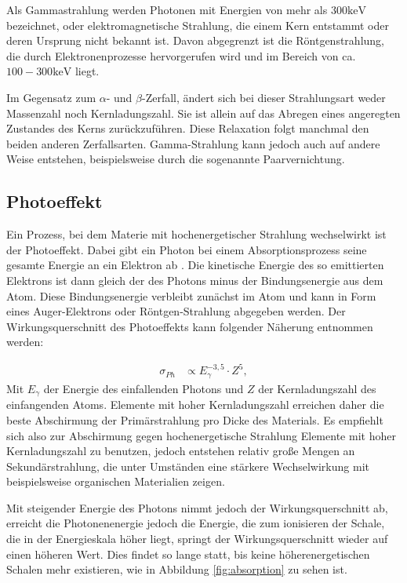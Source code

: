 \documentclass[
	parskip=half,10pt,
	numbers= noenddot, %
	toc=flat, %
	oneside,
	twocolumn,
	]{scrartcl}
\begin{document}
Als Gammastrahlung werden Photonen mit Energien von mehr als $300 \si{\kilo \electronvolt}$ bezeichnet, oder elektromagnetische Strahlung, die einem Kern 
entstammt oder deren Ursprung nicht bekannt ist. Davon abgegrenzt ist die Röntgenstrahlung, die durch Elektronenprozesse hervorgerufen wird und im Bereich von 
ca. $100-300 \si{\kilo \electronvolt}$ liegt. 

Im Gegensatz zum $\alpha$- und $\beta$-Zerfall, ändert sich bei dieser Strahlungsart weder Massenzahl noch Kernladungszahl. Sie ist allein auf das Abregen eines 
angeregten Zustandes des Kerns zurückzuführen. Diese Relaxation folgt manchmal den beiden anderen Zerfallsarten. Gamma-Strahlung kann jedoch auch auf andere 
Weise entstehen, beispielsweise durch die sogenannte Paarvernichtung. 

\subsection{Photoeffekt}

Ein Prozess, bei dem Materie mit hochenergetischer Strahlung wechselwirkt ist der Photoeffekt. Dabei gibt ein Photon bei einem Absorptionsprozess seine gesamte Energie 
an ein Elektron ab \cite{schatz}. Die kinetische Energie des so emittierten Elektrons ist dann gleich der des Photons minus der Bindungsenergie aus dem Atom. Diese 
Bindungsenergie verbleibt zunächst im Atom und kann in Form eines Auger-Elektrons oder Röntgen-Strahlung abgegeben werden. Der Wirkungsquerschnitt 
des Photoeffekts kann folgender Näherung entnommen werden:

\begin{align}
\sigma_{Ph} &\propto E^{-3,5}_{\gamma} \cdot Z^5,
\end{align}
Mit $E_{\gamma}$ der Energie des einfallenden Photons und $Z$ der Kernladungszahl des einfangenden Atoms. Elemente mit hoher Kernladungszahl erreichen daher die 
beste Abschirmung der Primärstrahlung pro Dicke des Materials. Es empfiehlt sich also zur Abschirmung gegen hochenergetische 
Strahlung Elemente mit hoher Kernladungszahl zu benutzen, jedoch entstehen relativ große Mengen an Sekundärstrahlung, die unter Umständen eine stärkere 
Wechselwirkung mit beispielsweise organischen Materialien zeigen.  


Mit steigender Energie des Photons nimmt jedoch der Wirkungsquerschnitt ab, erreicht die Photonenenergie jedoch die Energie, die zum ionisieren der Schale, die in 
der Energieskala höher liegt, springt der Wirkungsquerschnitt wieder auf einen höheren Wert. Dies findet so lange statt, bis keine höherenergetischen Schalen mehr 
existieren, wie in Abbildung \ref{fig:absorption} zu sehen ist. 
\end{document}
